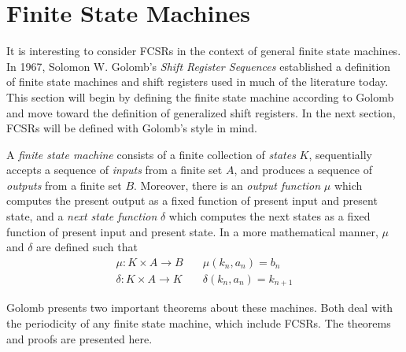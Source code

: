 \section{Finite State Machines}
\par It is interesting to consider FCSRs in the context of general finite
state machines. In 1967, Solomon W. Golomb's {\em Shift Register Sequences}
\cite{bk:g67} established a definition of finite state machines and shift
registers used in much of the literature today. This section will begin by
defining the finite state machine according to Golomb and move toward the
definition of generalized shift registers. In the next section, FCSRs will
be defined with Golomb's style in mind.

\begin{definition}\label{finite-state-machine}
  A {\em finite state machine} consists of a finite collection of {\em states}
  $K$, sequentially accepts a sequence of {\em inputs} from a finite set
  $A$, and produces a sequence of {\em outputs} from a finite set
  $B$. Moreover, there is an {\em output function} $\mu$ which computes
  the present output as a fixed function of present input and present state, and a
  {\em next state function} $\delta$ which computes the next states as a fixed
  function of present input and present state. In a more mathematical manner,
  $\mu$ and $\delta$ are defined such that
  \begin{eqnarray}
    \mu:K \times A \rightarrow B \quad &\mu(k_n,a_n)=b_n \\
    \delta:K \times A \rightarrow K \quad &\delta(k_n,a_n)=k_{n+1}
  \end{eqnarray}
\end{definition}


\par Golomb presents two important theorems about these machines. Both deal with
the periodicity of any finite state machine, which include FCSRs. The theorems
and proofs are presented here.


